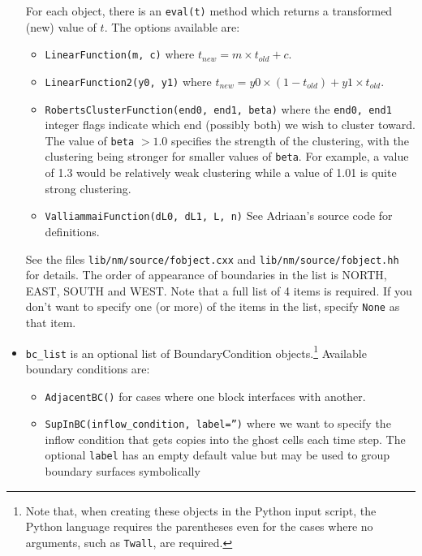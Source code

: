 \documentclass[12pt,a4paper,twoside]{article}
\begin{document}
\begin{itemize}
  For each object, there is an \texttt{eval(t)} method which returns a transformed (new) value of $t$.
  The options available are:
  \begin{itemize}
    \item \texttt{LinearFunction(m, c)}
      where $t_{new} = m \times t_{old} + c$.
    \item \texttt{LinearFunction2(y0, y1)}
      where $t_{new} = y0 \times (1-t_{old}) + y1 \times t_{old}$.
    \item \texttt{RobertsClusterFunction(end0, end1, beta)}
      where the \texttt{end0, end1} integer flags indicate which end (possibly both) we wish to cluster toward.
      The value of \texttt{beta} $> 1.0$ specifies the strength of the clustering, with the clustering
      being stronger for smaller values of \texttt{beta}.
      For example, a value of 1.3 would be relatively weak clustering while a value of 1.01 is quite strong
      clustering.
    \item \texttt{ValliammaiFunction(dL0, dL1, L, n)}
      See Adriaan's source code for definitions.
  \end{itemize}
  See the files \texttt{lib/nm/source/fobject.cxx} and \texttt{lib/nm/source/fobject.hh} for details.
  The order of appearance of boundaries in the list is NORTH, EAST, SOUTH and WEST.
  Note that a full list of 4 items is required.
  If you don't want to specify one (or more) of the items in the list, specify \texttt{None} as that item.
\item \texttt{bc\_list} is an optional list of BoundaryCondition objects.\footnote{Note that, 
  when creating these objects in the Python input script, the Python language requires the parentheses
  even for the cases where no arguments, such as \texttt{Twall}, are required. }
  Available boundary conditions are:
  \begin{itemize}
    \item \texttt{AdjacentBC()} for cases where one block interfaces with another.
    \item \texttt{SupInBC(inflow\_condition, label='')} where we want to specify the inflow condition
      that gets copies into the ghost cells each time step.
      The optional \texttt{label} has an empty default value but may be used to group boundary surfaces symbolically

\end{itemize}
\end{itemize}
\end{document}
